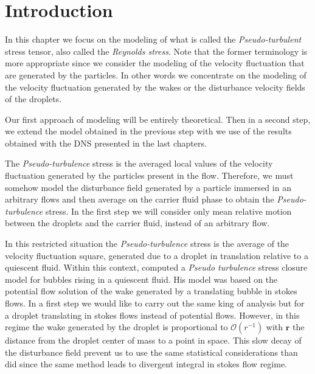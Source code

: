 \section{Introduction}


In this chapter we focus on the modeling of what is called the \textit{Pseudo-turbulent} stress tensor, also called the \textit{Reynolds stress}. 
Note that the former terminology is more appropriate since we consider the modeling of the velocity fluctuation that are generated by the particles. 
In other words we concentrate on the modeling of the velocity fluctuation generated by the wakes or the disturbance velocity fields of the droplets. 

Our first approach of modeling will be entirely theoretical.
Then in a second step, we extend the model obtained in the previous step with we use of the results obtained with the DNS presented in the last chapters.  

The \textit{Pseudo-turbulence} stress is the averaged local values of the velocity fluctuation generated by the particles present in the flow. 
Therefore, we must somehow model the disturbance field generated by a particle immersed in an arbitrary flows and then average on the carrier fluid phase to obtain the \textit{Pseudo-turbulence} stress.
In the first step we will consider only mean relative motion between the droplets and the carrier fluid, instead of an arbitrary flow. 

In this restricted situation the \textit{Pseudo-turbulence} stress is the average of the velocity fluctuation square, generated due to a droplet in translation relative to a quiescent fluid.
Within this context, \citet{van1998pseudo} computed a \textit{Pseudo turbulence} stress closure model for bubbles rising in a quiescent fluid. 
His model was based on the potential flow solution of the wake generated by a translating bubble in stokes flows.
In a first step we would like to carry out the same king of analysis but for a droplet translating in stokes flows instead of potential flows.
However, in this regime the wake generated by the droplet is proportional to $\mathcal{O}(r^{-1})$ with $\textbf{r}$ the distance from the droplet center of mass to a point in space. 
This slow decay of the disturbance field prevent us to use the same statistical considerations than \citet{van1998pseudo} did since the same method leads to divergent integral in stokes flow regime. 


